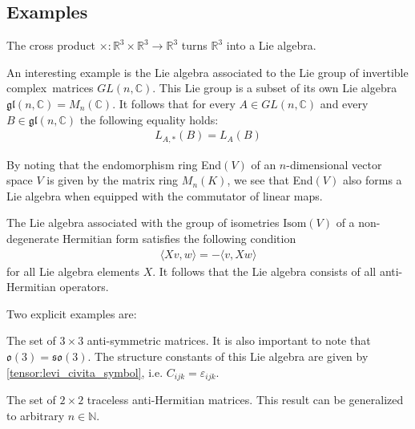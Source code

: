 \subsection{Examples}

        \begin{example}
        	The cross product $\times:\mathbb{R}^3\times\mathbb{R}^3\rightarrow\mathbb{R}^3$ turns $\mathbb{R}^3$ into a Lie algebra.
        \end{example}
        \begin{example}
        	An interesting example is the Lie algebra associated to the Lie group of invertible complex\footnotemark\ matrices $GL(n, \mathbb{C})$. This Lie group is a subset of its own Lie algebra $\mathfrak{gl}(n, \mathbb{C}) = M_n(\mathbb{C})$. It follows that for every $A\in GL(n, \mathbb{C})$ and every $B\in\mathfrak{gl}(n, \mathbb{C})$ the following equality holds:
        	\begin{gather}
        		L_{A,\ast}(B) = L_A(B)
        	\end{gather}
        \end{example}
        \begin{result}\label{lie:end_as_lie_algebra}
        	By noting that the endomorphism ring End$(V)$ of an $n$-dimensional vector space $V$ is given by the matrix ring $M_n(K)$, we see that End$(V)$ also forms a Lie algebra when equipped with the commutator of linear maps.
        \end{result}
        
        \begin{example}
	    	The Lie algebra associated with the group of isometries $\text{Isom}(V)$ of a non-degenerate Hermitian form satisfies the following condition
	        \begin{gather}
        		\label{lie:lie_isometry}
        		\langle Xv, w \rangle = -\langle v, Xw \rangle
        	\end{gather}
        	for all Lie algebra elements $X$. It follows that the Lie algebra consists of all anti-Hermitian operators.
	\end{example}
	Two explicit examples are:
        \begin{example}
        	The set of $3\times3$ anti-symmetric matrices. It is also important to note that $\mathfrak{o}(3) = \mathfrak{so}(3)$. The structure constants of this Lie algebra are given by \ref{tensor:levi_civita_symbol}, i.e. $C_{ijk} = \varepsilon_{ijk}$.
        \end{example}
        \begin{example}
        	The set of $2\times2$ traceless anti-Hermitian matrices. This result can be generalized to arbitrary $n\in\mathbb{N}$.
        \end{example}
        
